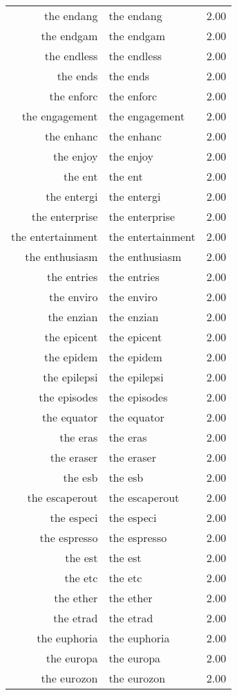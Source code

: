 \begin{table}[ht]
\begin{tabular}{rlr}
  the endang & the endang & 2.00 \\ 
  the endgam & the endgam & 2.00 \\ 
  the endless & the endless & 2.00 \\ 
  the ends & the ends & 2.00 \\ 
  the enforc & the enforc & 2.00 \\ 
  the engagement & the engagement & 2.00 \\ 
  the enhanc & the enhanc & 2.00 \\ 
  the enjoy & the enjoy & 2.00 \\ 
  the ent & the ent & 2.00 \\ 
  the entergi & the entergi & 2.00 \\ 
  the enterprise & the enterprise & 2.00 \\ 
  the entertainment & the entertainment & 2.00 \\ 
  the enthusiasm & the enthusiasm & 2.00 \\ 
  the entries & the entries & 2.00 \\ 
  the enviro & the enviro & 2.00 \\ 
  the enzian & the enzian & 2.00 \\ 
  the epicent & the epicent & 2.00 \\ 
  the epidem & the epidem & 2.00 \\ 
  the epilepsi & the epilepsi & 2.00 \\ 
  the episodes & the episodes & 2.00 \\ 
  the equator & the equator & 2.00 \\ 
  the eras & the eras & 2.00 \\ 
  the eraser & the eraser & 2.00 \\ 
  the esb & the esb & 2.00 \\ 
  the escaperout & the escaperout & 2.00 \\ 
  the especi & the especi & 2.00 \\ 
  the espresso & the espresso & 2.00 \\ 
  the est & the est & 2.00 \\ 
  the etc & the etc & 2.00 \\ 
  the ether & the ether & 2.00 \\ 
  the etrad & the etrad & 2.00 \\ 
  the euphoria & the euphoria & 2.00 \\ 
  the europa & the europa & 2.00 \\ 
  the eurozon & the eurozon & 2.00 \\ 

\end{tabular}
\end{table}
